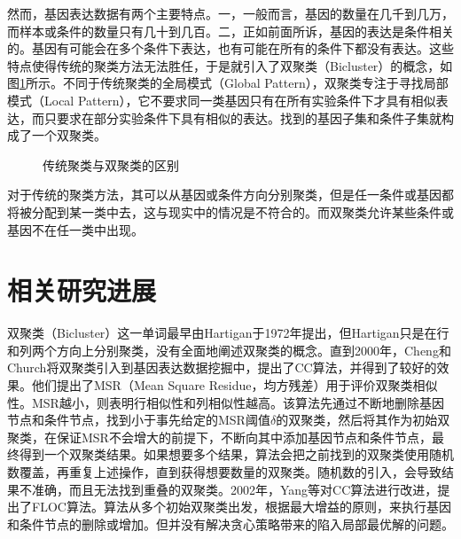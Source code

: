     然而，基因表达数据有两个主要特点。一，一般而言，基因的数量在几千到几万，而样本或条件的数量只有几十到几百。二，正如前面所诉，基因的表达是条件相关的。基因有可能会在多个条件下表达，也有可能在所有的条件下都没有表达。这些特点使得传统的聚类方法无法胜任，于是就引入了双聚类（Bicluster）的概念，如图\ref{fig:tradiAndBi}所示。不同于传统聚类的全局模式（Global Pattern），双聚类专注于寻找局部模式（Local Pattern），它不要求同一类基因只有在所有实验条件下才具有相似表达，而只要求在部分实验条件下具有相似的表达。找到的基因子集和条件子集就构成了一个双聚类。

    \begin{figure}[htbp]
    \setlength{\subfigcapskip}{-1bp}
    \centering
    \begin{minipage}{.9\textwidth}
    \centering
    \subfigure{}\addtocounter{subfigure}{-2}
    \subfigure{\subfigure[基因方向的传统聚类]{\texttt{[image: 1]}}}
    \hspace{.1em}
    \subfigure{}\addtocounter{subfigure}{-2}
    \subfigure{\subfigure[条件方向的传统聚类]{\texttt{[image: 2]}}}
    \hspace{.1em}
    \subfigure{}\addtocounter{subfigure}{-2}
    \subfigure{\subfigure[双聚类]{\texttt{[image: 3]}}}
    \end{minipage}
    \vspace{0.2em}
    \caption{传统聚类与双聚类的区别}
    \label{fig:tradiAndBi}
    \end{figure}
    对于传统的聚类方法，其可以从基因或条件方向分别聚类，但是任一条件或基因都将被分配到某一类中去，这与现实中的情况是不符合的。而双聚类允许某些条件或基因不在任一类中出现。

\section{相关研究进展}
    双聚类（Bicluster）这一单词最早由Hartigan于1972年提出，但Hartigan只是在行和列两个方向上分别聚类，没有全面地阐述双聚类的概念。直到2000年，Cheng和Church将双聚类引入到基因表达数据挖掘中，提出了CC算法，并得到了较好的效果。他们提出了MSR（Mean Square Residue，均方残差）用于评价双聚类相似性。MSR越小，则表明行相似性和列相似性越高。该算法先通过不断地删除基因节点和条件节点，找到小于事先给定的MSR阈值$\delta$的双聚类，然后将其作为初始双聚类，在保证MSR不会增大的前提下，不断向其中添加基因节点和条件节点，最终得到一个双聚类结果。如果想要多个结果，算法会把之前找到的双聚类使用随机数覆盖，再重复上述操作，直到获得想要数量的双聚类。随机数的引入，会导致结果不准确，而且无法找到重叠的双聚类。2002年，Yang等对CC算法进行改进，提出了FLOC算法。算法从多个初始双聚类出发，根据最大增益的原则，来执行基因和条件节点的删除或增加。但并没有解决贪心策略带来的陷入局部最优解的问题。

